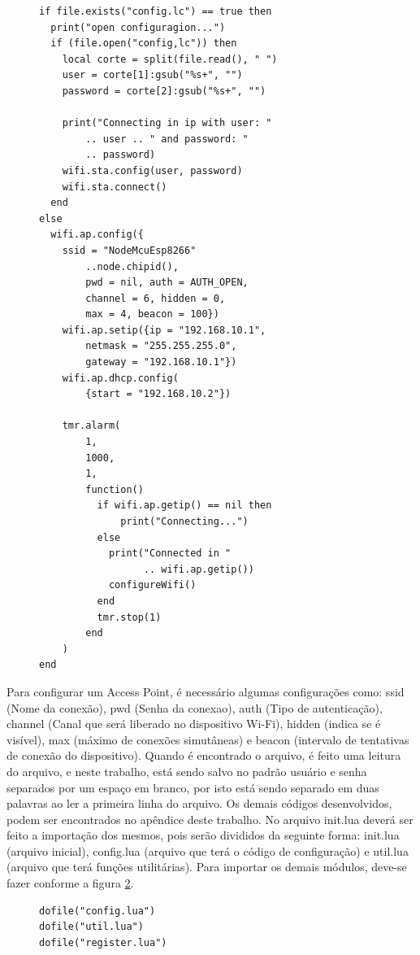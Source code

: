 \documentclass[journal]{IEEEtran}
\begin{document}
\begin{figure}[h]
\centering

\begin{verbatim}
if file.exists("config.lc") == true then
  print("open configuragion...")
  if (file.open("config,lc")) then
    local corte = split(file.read(), " ")
    user = corte[1]:gsub("%s+", "")
    password = corte[2]:gsub("%s+", "")
    
    print("Connecting in ip with user: "
        .. user .. " and password: " 
        .. password)
    wifi.sta.config(user, password)
    wifi.sta.connect()
  end
else
  wifi.ap.config({
    ssid = "NodeMcuEsp8266"
        ..node.chipid(), 
        pwd = nil, auth = AUTH_OPEN, 
        channel = 6, hidden = 0, 
        max = 4, beacon = 100})
    wifi.ap.setip({ip = "192.168.10.1", 
        netmask = "255.255.255.0",
        gateway = "192.168.10.1"})
    wifi.ap.dhcp.config(
        {start = "192.168.10.2"})

    tmr.alarm(
        1,
        1000,
        1,
        function()
          if wifi.ap.getip() == nil then
              print("Connecting...")
          else
            print("Connected in " 
                  .. wifi.ap.getip())
            configureWifi()
          end
          tmr.stop(1)
        end
    )
end
\end{verbatim}

\label{alg:trimcc}
\end{figure}

Para configurar um Access Point, é necessário algumas configurações como: ssid (Nome da conexão), pwd (Senha da conexao), auth (Tipo de autenticação), channel (Canal que será liberado no dispositivo Wi-Fi), hidden (indica se é visível), max (máximo de conexões simutâneas) e beacon (intervalo de tentativas de conexão do dispositivo). Quando é encontrado o arquivo, é feito uma leitura do arquivo, e neste trabalho, está sendo salvo no padrão usuário e senha separados por um espaço em branco, por isto está sendo separado em duas palavras ao ler a primeira linha do arquivo. Os demais códigos desenvolvidos, podem ser encontrados no apêndice deste trabalho. No arquivo init.lua deverá ser feito a importação dos mesmos, pois serão divididos da seguinte forma: init.lua (arquivo inicial), config.lua (arquivo que terá o código de configuração) e util.lua (arquivo que terá funções utilitárias). Para importar os demais módulos, deve-se fazer conforme a figura \ref{alg:importsdofile}.

\begin{figure}[h]
\centering

\begin{verbatim}
dofile("config.lua")
dofile("util.lua")
dofile("register.lua")
\end{verbatim}

\label{alg:importsdofile}
\end{figure}
\end{document}
